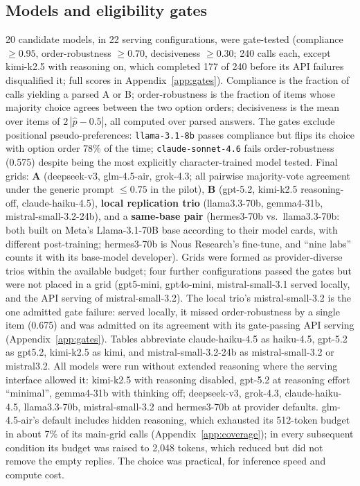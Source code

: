 \documentclass[11pt]{article}
\begin{document}
\subsection{Models and eligibility gates}\label{sec:models}
20 candidate models, in 22 serving configurations, were gate-tested (compliance
$\ge 0.95$, order-robustness $\ge 0.70$, decisiveness $\ge 0.30$; 240 calls
each, except kimi-k2.5 with reasoning on, which completed 177 of 240 before
its API failures disqualified it; full scores in Appendix~\ref{app:gates}).
Compliance is the fraction of calls yielding a parsed A or B; order-robustness
is the fraction of items whose majority choice agrees between the two option
orders; decisiveness is the mean over items of $2\,|\hat p - 0.5|$, all
computed over parsed answers. The gates exclude
positional pseudo-preferences: \texttt{llama-3.1-8b} passes compliance but
flips its choice with option order 78\% of the time; \texttt{claude-sonnet-4.6}
fails order-robustness (0.575) despite being the most explicitly
character-trained model tested. Final grids: \textbf{A} (deepseek-v3,
glm-4.5-air, grok-4.3; all pairwise majority-vote agreement under the
generic prompt $\le 0.75$ in the pilot),
\textbf{B} (gpt-5.2, kimi-k2.5 reasoning-off, claude-haiku-4.5),
\textbf{local replication trio} (llama3.3-70b, gemma4-31b,
mistral-small-3.2-24b), and a \textbf{same-base pair} (hermes3-70b vs.\
llama3.3-70b: both built on Meta's Llama-3.1-70B base according to their
model cards, with different post-training; hermes3-70b is Nous Research's
fine-tune, and ``nine labs'' counts it with its base-model developer). Grids
were formed as provider-diverse trios within the available budget; four
further configurations passed the gates but were not placed in a grid
(gpt5-mini, gpt4o-mini, mistral-small-3.1 served locally, and the API
serving of mistral-small-3.2). The local trio's mistral-small-3.2 is the one
admitted gate failure: served locally, it missed order-robustness by a single
item (0.675) and was admitted on its agreement with its gate-passing API
serving (Appendix~\ref{app:gates}). Tables abbreviate claude-haiku-4.5 as
haiku-4.5, gpt-5.2 as gpt5.2, kimi-k2.5 as kimi, and mistral-small-3.2-24b
as mistral-small-3.2 or mistral3.2. All models were
run without extended reasoning where the serving interface allowed it:
kimi-k2.5 with reasoning disabled, gpt-5.2 at reasoning effort ``minimal'',
gemma4-31b with thinking off; deepseek-v3, grok-4.3, claude-haiku-4.5,
llama3.3-70b, mistral-small-3.2 and hermes3-70b at provider defaults.
glm-4.5-air's default includes hidden reasoning, which exhausted its
512-token budget in about 7\% of its main-grid calls
(Appendix~\ref{app:coverage}); in every subsequent condition its budget was
raised to 2{,}048 tokens, which reduced but did not remove the empty
replies. The choice was practical, for inference speed and compute cost.
\end{document}
